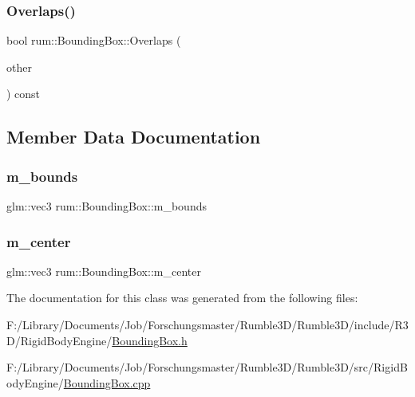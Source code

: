 \mbox{\label{classrum_1_1_bounding_box_af7d2034adecd49f949b7bf5bfa942498}} 
\subsubsection{\texorpdfstring{Overlaps()}{Overlaps()}}
{\footnotesize\ttfamily bool rum\+::\+Bounding\+Box\+::\+Overlaps (\begin{DoxyParamCaption}\item[{const \hyperlink{classrum_1_1_bounding_box}{Bounding\+Box} $\ast$}]{other }\end{DoxyParamCaption}) const}



\subsection{Member Data Documentation}
\mbox{\label{classrum_1_1_bounding_box_a676df9315a0bf21962b02c65cb765a3a}} 
\subsubsection{\texorpdfstring{m\+\_\+bounds}{m\_bounds}}
{\footnotesize\ttfamily glm\+::vec3 rum\+::\+Bounding\+Box\+::m\+\_\+bounds\hspace{0.3cm}{\ttfamily [protected]}}

\mbox{\label{classrum_1_1_bounding_box_af9c7a5df5b02f646a1aa0d5cf0c4e1fd}} 
\subsubsection{\texorpdfstring{m\+\_\+center}{m\_center}}
{\footnotesize\ttfamily glm\+::vec3 rum\+::\+Bounding\+Box\+::m\+\_\+center\hspace{0.3cm}{\ttfamily [protected]}}



The documentation for this class was generated from the following files\+:\begin{DoxyCompactItemize}
\item 
F\+:/\+Library/\+Documents/\+Job/\+Forschungsmaster/\+Rumble3\+D/\+Rumble3\+D/include/\+R3\+D/\+Rigid\+Body\+Engine/\hyperlink{_bounding_box_8h}{Bounding\+Box.\+h}\item 
F\+:/\+Library/\+Documents/\+Job/\+Forschungsmaster/\+Rumble3\+D/\+Rumble3\+D/src/\+Rigid\+Body\+Engine/\hyperlink{_bounding_box_8cpp}{Bounding\+Box.\+cpp}\end{DoxyCompactItemize}
